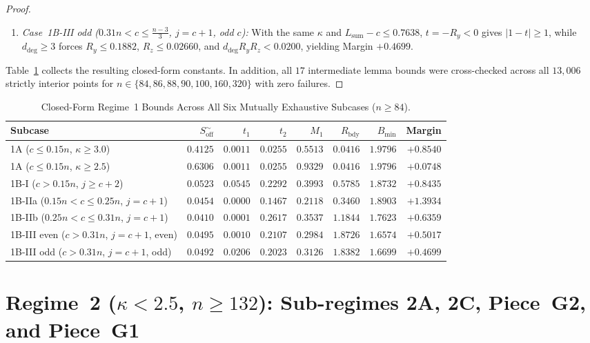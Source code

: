 \documentclass[10pt]{article}
\numberwithin{equation}{section}
\theoremstyle{plain}
\theoremstyle{definition}
\newcommand{\1}{\mathbf{1}}
\begin{document}
\begin{proof}
\begin{enumerate}[label=(\arabic*)]
    \item \emph{Case~1B-III odd ($0.31n < c \le \frac{n-3}{3}$, $j = c + 1$, odd $c$):} With the same $\kappa$ and $L_{\mathrm{sum}} - c \le 0.7638$, $t = -R_y < 0$ gives $|1 - t| \ge 1$, while $d_{\mathrm{deg}} \ge 3$ forces $R_y \le 0.1882$, $R_z \le 0.02660$, and $d_{\mathrm{deg}} R_y R_z < 0.0200$, yielding Margin $+0.4699$.
\end{enumerate}
Table~\ref{tab:regime1} collects the resulting closed-form constants. In addition, all $17$ intermediate lemma bounds were cross-checked across all $13{,}006$ strictly interior points for $n \in \{84, 86, 88, 90, 100, 160, 320\}$ with zero failures.
\end{proof}

\begin{table}[htbp]
\centering
\caption{Closed-Form Regime~1 Bounds Across All Six Mutually Exhaustive Subcases ($n \ge 84$).}
\label{tab:regime1}
\footnotesize
\begin{tabular}{@{}lrrrrrrr@{}}
\toprule
\textbf{Subcase} & $S_{\mathrm{off}}^\sim$ & $t_1$ & $t_2$ & $M_1$ & $R_{\mathrm{bdy}}$ & $B_{\min}$ & \textbf{Margin} \\
\midrule
1A ($c \le 0.15n$, $\kappa \ge 3.0$) & $0.4125$ & $0.0011$ & $0.0255$ & $0.5513$ & $0.0416$ & $1.9796$ & $+0.8540$ \\
1A ($c \le 0.15n$, $\kappa \ge 2.5$) & $0.6306$ & $0.0011$ & $0.0255$ & $0.9329$ & $0.0416$ & $1.9796$ & $+0.0748$ \\
1B-I ($c > 0.15n$, $j \ge c + 2$) & $0.0523$ & $0.0545$ & $0.2292$ & $0.3993$ & $0.5785$ & $1.8732$ & $+0.8435$ \\
1B-IIa ($0.15n < c \le 0.25n$, $j = c + 1$) & $0.0454$ & $0.0000$ & $0.1467$ & $0.2118$ & $0.3460$ & $1.8903$ & $+1.3934$ \\
1B-IIb ($0.25n < c \le 0.31n$, $j = c + 1$) & $0.0410$ & $0.0001$ & $0.2617$ & $0.3537$ & $1.1844$ & $1.7623$ & $+0.6359$ \\
1B-III even ($c > 0.31n$, $j = c + 1$, even) & $0.0495$ & $0.0010$ & $0.2107$ & $0.2984$ & $1.8726$ & $1.6574$ & $+0.5017$ \\
1B-III odd ($c > 0.31n$, $j = c + 1$, odd) & $0.0492$ & $0.0206$ & $0.2023$ & $0.3126$ & $1.8382$ & $1.6699$ & $+0.4699$ \\
\bottomrule
\end{tabular}
\end{table}

\section{Regime~2 (\texorpdfstring{$\kappa < 2.5$, $n \ge 132$}{kappa < 2.5, n >= 132}): Sub-regimes 2A, 2C, Piece~G2, and Piece~G1}
\label{sec:regime2}
\end{document}
